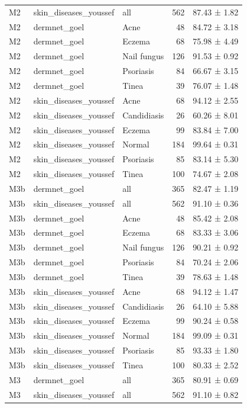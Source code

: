 \begin{tabular}{lllrl}
M2 & skin\_diseases\_youssef & all & 562 & 87.43 ± 1.82 \\
M2 & dermnet\_goel & Acne & 48 & 84.72 ± 3.18 \\
M2 & dermnet\_goel & Eczema & 68 & 75.98 ± 4.49 \\
M2 & dermnet\_goel & Nail fungus & 126 & 91.53 ± 0.92 \\
M2 & dermnet\_goel & Psoriasis & 84 & 66.67 ± 3.15 \\
M2 & dermnet\_goel & Tinea & 39 & 76.07 ± 1.48 \\
M2 & skin\_diseases\_youssef & Acne & 68 & 94.12 ± 2.55 \\
M2 & skin\_diseases\_youssef & Candidiasis & 26 & 60.26 ± 8.01 \\
M2 & skin\_diseases\_youssef & Eczema & 99 & 83.84 ± 7.00 \\
M2 & skin\_diseases\_youssef & Normal & 184 & 99.64 ± 0.31 \\
M2 & skin\_diseases\_youssef & Psoriasis & 85 & 83.14 ± 5.30 \\
M2 & skin\_diseases\_youssef & Tinea & 100 & 74.67 ± 2.08 \\
M3b & dermnet\_goel & all & 365 & 82.47 ± 1.19 \\
M3b & skin\_diseases\_youssef & all & 562 & 91.10 ± 0.36 \\
M3b & dermnet\_goel & Acne & 48 & 85.42 ± 2.08 \\
M3b & dermnet\_goel & Eczema & 68 & 83.33 ± 3.06 \\
M3b & dermnet\_goel & Nail fungus & 126 & 90.21 ± 0.92 \\
M3b & dermnet\_goel & Psoriasis & 84 & 70.24 ± 2.06 \\
M3b & dermnet\_goel & Tinea & 39 & 78.63 ± 1.48 \\
M3b & skin\_diseases\_youssef & Acne & 68 & 94.12 ± 1.47 \\
M3b & skin\_diseases\_youssef & Candidiasis & 26 & 64.10 ± 5.88 \\
M3b & skin\_diseases\_youssef & Eczema & 99 & 90.24 ± 0.58 \\
M3b & skin\_diseases\_youssef & Normal & 184 & 99.09 ± 0.31 \\
M3b & skin\_diseases\_youssef & Psoriasis & 85 & 93.33 ± 1.80 \\
M3b & skin\_diseases\_youssef & Tinea & 100 & 80.33 ± 2.52 \\
M3 & dermnet\_goel & all & 365 & 80.91 ± 0.69 \\
M3 & skin\_diseases\_youssef & all & 562 & 91.10 ± 0.82 \\

\end{tabular}

